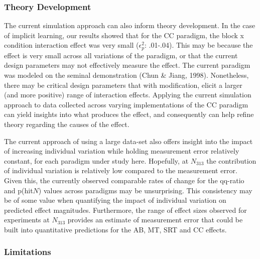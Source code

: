 \documentclass[
  man]{apa6}
\begin{document}
\hypertarget{theory-development}{%
\subsubsection{Theory Development}\label{theory-development}}

The current simulation approach can also inform theory development. In the case of implicit learning, our results showed that for the CC paradigm, the block x condition interaction effect was very small (\(\epsilon_{p}^2\): .01-.04). This may be because the effect is very small across all variations of the paradigm, or that the current design parameters may not effectively measure the effect. The current paradigm was modeled on the seminal demonstration (Chun \& Jiang, 1998). Nonetheless, there may be critical design parameters that with modification, elicit a larger (and more positive) range of interaction effects. Applying the current simulation approach to data collected across varying implementations of the CC paradigm can yield insights into what produces the effect, and consequently can help refine theory regarding the causes of the effect.

The current approach of using a large data-set also offers insight into the impact of increasing individual variation while holding measurement error relatively constant, for each paradigm under study here. Hopefully, at \(N_{313}\) the contribution of individual variation is relatively low compared to the measurement error. Given this, the currently observed comparable rates of change for the qq-ratio and p(hit\textbar{}\(N\)) values across paradigms may be unsurprising. This consistency may be of some value when quantifying the impact of individual variation on predicted effect magnitudes. Furthermore, the range of effect sizes observed for experiments at \(N_{313}\) provides an estimate of measurement error that could be built into quantitative predictions for the AB, MT, SRT and CC effects.

\hypertarget{limitations}{%
\subsubsection{Limitations}\label{limitations}}
\end{document}
